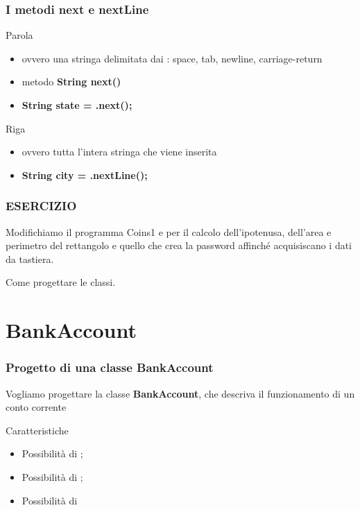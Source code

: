 \begin{frame}
\frametitle{I metodi next e nextLine}
\begin{block}{Parola}
\begin{itemize}
\item ovvero una stringa delimitata dai : space, tab, newline, carriage-return
\item metodo \textbf{String next()}
\item \textbf{\alert{String} state = .\alert{next()};}
\end{itemize}
\end{block}
\begin{block}{Riga}
\begin{itemize}
\item ovvero tutta l'intera stringa che viene inserita
\item \textbf{\alert{String} city = .\alert{nextLine()};}
\end{itemize}
\end{block}
\end{frame}

\begin{frame}
\frametitle{ESERCIZIO}
\begin{block}{}
Modifichiamo il programma Coins1 e per il calcolo dell'ipotenusa, dell'area e perimetro del rettangolo e quello che 
crea la password affinché acquisiscano i dati da tastiera.
\end{block}
\end{frame}

\begin{frame}
\begin{block}{}
\begin{huge}
Come progettare le classi.
\end{huge}
\end{block}
\end{frame}
\section*{BankAccount}
\begin{frame}
\frametitle{Progetto di una classe BankAccount}
\begin{block}{}
Vogliamo progettare la classe \textbf{BankAccount}, che descriva il funzionamento di un conto corrente
\end{block}
\pause
\begin{block}{Caratteristiche}
\begin{itemize}
\item Possibilità di ;
\item Possibilità di ;
\item Possibilità di 
\end{itemize}
\end{block}
\end{frame}

